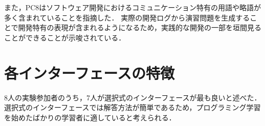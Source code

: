 

また，PC8はソフトウェア開発におけるコミュニケーション特有の用語や略語が多く含まれていることを指摘した．
実際の開発ログから演習問題を生成することで開発特有の表現が含まれるようになるため，実践的な開発の一部を垣間見ることができることが示唆されている．












\section*{各インターフェースの特徴}

8人の実験参加者のうち，7人が選択式のインターフェースが最も良いと述べた．
選択式のインターフェースでは解答方法が簡単であるため，プログラミング学習を始めたばかりの学習者に適していると考えられる．




